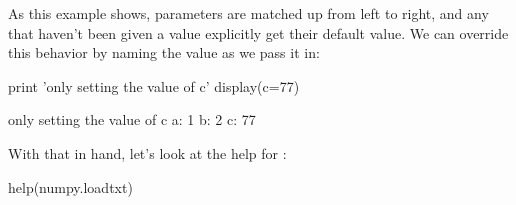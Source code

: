 As this example shows, parameters are matched up from left to right, and
any that haven't been given a value explicitly get their default value.
We can override this behavior by naming the value as we pass it in:

\begin{VerbIn}
print 'only setting the value of c'
display(c=77)
\end{VerbIn}

\begin{VerbOut}
only setting the value of c
a: 1 b: 2 c: 77
\end{VerbOut}

With that in hand, let's look at the help for :

\begin{VerbIn}
help(numpy.loadtxt)
\end{VerbIn}

